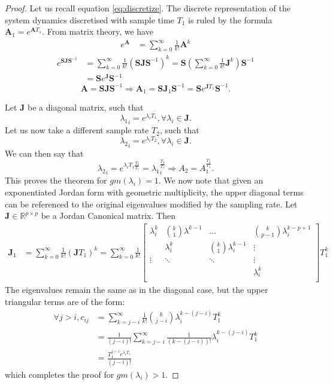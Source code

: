 \documentclass[sigconf]{llncs}
\newcommand{\mat}[1]{\boldsymbol{#1}}
\renewcommand{\vec}[1]{\boldsymbol{#1}}
\begin{document}
 \begin{proof}
 Let us recall equation \ref{eq:discretize}. The discrete representation of the system dynamics discretised with sample time $T_1$ is ruled by the formula
 $\mat{A}_1 = e^{\mat{A} T_1}$. From matrix theory, we have 
\begin{align}
 e^{\mat{A}}&=\sum_{k=0}^\infty \frac{1}{k!}\mat{A}^k
\end{align} 
\begin{align} 
 e^{\mat{S}\mat{J}\mat{S}^{-1}}&=\sum_{k=0}^\infty \frac{1}{k!}\left(\mat{S}\mat{J}\mat{S}^{-1}\right)^k
 =\mat{S} \left (\sum_{k=0}^\infty \frac{1}{k!}\mat{J}^k\right) \mat{S}^{-1}\nonumber\\
 &=\mat{S}e^{\mat{J}}\mat{S}^{-1}
\end{align} 
\begin{equation}
\mat{A}=\mat{S}\mat{J}\mat{S}^{-1} \Rightarrow \vec{A}_1 = \mat{S}\mat{J}_1\mat{S}^{-1}= \mat{S}e^{\mat{J} T_1}\mat{S}^{-1}.
 \end{equation}
 
 Let $\mat{J}$ be a diagonal matrix, such that 
 $${\lambda_1}_i=e^{\lambda_i T_1}, \forall \lambda_i \in \mat{J}.$$
 Let us now take a different sample rate $T_2$, such that 
 $${\lambda_2}_i=e^{\lambda_i T_2}, \forall \lambda_i \in \mat{J}.$$
 We can then say that 
 \begin{equation}
 {\lambda_2}_i=e^{\lambda_i T_1 \frac{T_2}{T_1}}={\lambda_1}_i^{\frac{T_2}{T_1}} \Rightarrow A_2=A_1^{\frac{T_2}{T_1}}.
 \end{equation}
 This proves the theorem for $gm(\lambda_i)=1$.
 We now note that given an exponentiated Jordan form with geometric multiplicity, the upper diagonal terms can be
 referenced to the original eigenvalues modified by the sampling rate.
  Let $\mat{J}\in \mathbb{R}^{p \times p}$ be a Jordan Canonical matrix.
 Then
\begin{align}
 \mat{J}_1&=\sum_{k=0}^\infty \frac{1}{k!}\left(\mat{J}T_1\right)^k=\sum_{k=0}^\infty \frac{1}{k!} \left [ \begin{array}{cccc}
 \lambda_i^k  & \binom{k}{1}  \lambda^{k-1} & \hdots  & \binom{k}{p-1} \lambda_i^{k-p+1} \\
& \lambda_i^k  & \binom{k}{1}  \lambda_i^{k-1} & \vdots \\
\vdots & \ddots & \ddots & \vdots \\
& &  &\lambda_i^k \\
\end{array} \right ] T_1^k
\end{align}
The eigenvalues remain the same as in the diagonal case, but the upper triangular terms are of the form:
\begin{align}
\forall j>i, c_{ij}&=\sum_{k=j-i}^\infty \frac{1}{k!}\binom{k}{j-i} \lambda_i^{k-(j-i)}T_1^k\\
&=\frac{1}{(j-i)!}\sum_{k=j-i}^\infty \frac{1}{(k-(j-i))!} \lambda_i^{k-(j-i)}T_1^k\nonumber\\
&=\frac{T_1^{j-i}e^{\lambda_i T_1}}{(j-i)!}\nonumber
\end{align}
which completes the proof for $gm(\lambda_i)>1$.
\end{proof}
\end{document}
